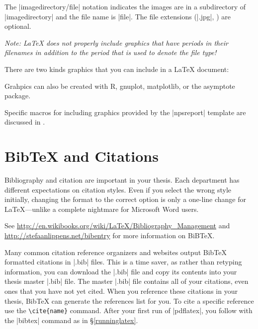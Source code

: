 The |imagedirectory/file| notation indicates the images are in a subdirectory of |imagedirectory| and the file name is |file|.  The file extensions (|.jpg|, \etc) are optional. 

\emph{Note: \LaTeX{} does not properly include graphics that have
  periods in their filenames in addition to the period that is used to
  denote the file type!} 

There are two kinds graphics that you can include in a \LaTeX{}
document: 

Grahpics can also be created with R, gnuplot, matplotlib, or the asymptote
package.

Specific macros for including graphics provided by the |npsreport| template are
discussed in .

\section{Bib\TeX{} and Citations}
Bibliography and citation are important in your thesis.  Each department has different expectations
on citation styles.  Even if you select the wrong style initially, changing the format to the correct
option is only a one-line change for \LaTeX{}---unlike a complete nightmare for Microsoft Word users.

See \url{http://en.wikibooks.org/wiki/LaTeX/Bibliography_Management} and
 \\ \url{http://stefaanlippens.net/bibentry} for more information on BiB\TeX.
 
Many common citation reference organizers and websites output Bib\TeX{}
formatted citations in |.bib| files.  This is a time saver, as rather than
retyping information, you can download the |.bib| file and copy its contents
into your thesis master |.bib| file.  The master |.bib| file contains all of
your citations, even ones that you have not yet cited.  When you reference
these citations in your thesis, Bib\TeX{} can generate the references list for
you.  To cite a specific reference use the \verb|\cite{name}| command.  After
your first run of |pdflatex|, you follow with the |bibtex| command as in
\S\ref{runninglatex}. 

